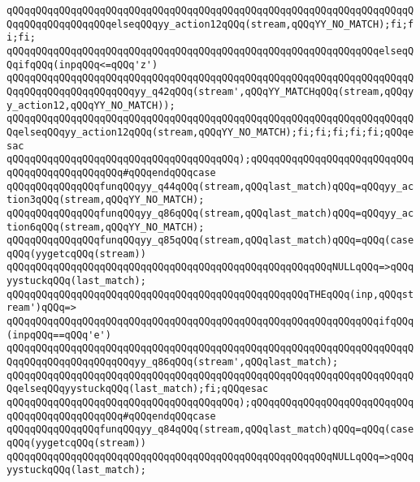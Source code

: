 \verb|qQQqqQQqqQQqqQQqqQQqqQQqqQQqqQQqqQQqqQQqqQQqqQQqqQQqqQQqqQQqqQQqqQQqqQQqqQQqqQQqqQQqqQQqelseqQQqyy_action12qQQq(stream,qQQqYY_NO_MATCH);fi;fi;fi;|\newline
\verb|qQQqqQQqqQQqqQQqqQQqqQQqqQQqqQQqqQQqqQQqqQQqqQQqqQQqqQQqqQQqqQQqelseqQQqifqQQq(inpqQQq<=qQQq'z')|\newline
\verb|qQQqqQQqqQQqqQQqqQQqqQQqqQQqqQQqqQQqqQQqqQQqqQQqqQQqqQQqqQQqqQQqqQQqqQQqqQQqqQQqqQQqqQQqqQQqyy_q42qQQq(stream',qQQqYY_MATCHqQQq(stream,qQQqyy_action12,qQQqYY_NO_MATCH));|\newline
\verb|qQQqqQQqqQQqqQQqqQQqqQQqqQQqqQQqqQQqqQQqqQQqqQQqqQQqqQQqqQQqqQQqqQQqqQQqelseqQQqyy_action12qQQq(stream,qQQqYY_NO_MATCH);fi;fi;fi;fi;fi;qQQqesac|\newline
\verb|qQQqqQQqqQQqqQQqqQQqqQQqqQQqqQQqqQQqqQQq);qQQqqQQqqQQqqQQqqQQqqQQqqQQqqQQqqQQqqQQqqQQqqQQq#qQQqendqQQqcase|\newline
\verb|qQQqqQQqqQQqqQQqfunqQQqyy_q44qQQq(stream,qQQqlast_match)qQQq=qQQqyy_action3qQQq(stream,qQQqYY_NO_MATCH);|\newline
\verb|qQQqqQQqqQQqqQQqfunqQQqyy_q86qQQq(stream,qQQqlast_match)qQQq=qQQqyy_action6qQQq(stream,qQQqYY_NO_MATCH);|\newline
\verb|qQQqqQQqqQQqqQQqfunqQQqyy_q85qQQq(stream,qQQqlast_match)qQQq=qQQq(caseqQQq(yygetcqQQq(stream))|\newline
\verb|qQQqqQQqqQQqqQQqqQQqqQQqqQQqqQQqqQQqqQQqqQQqqQQqqQQqqQQqNULLqQQq=>qQQqyystuckqQQq(last_match);|\newline
\verb|qQQqqQQqqQQqqQQqqQQqqQQqqQQqqQQqqQQqqQQqqQQqqQQqqQQqTHEqQQq(inp,qQQqstream')qQQq=>|\newline
\verb|qQQqqQQqqQQqqQQqqQQqqQQqqQQqqQQqqQQqqQQqqQQqqQQqqQQqqQQqqQQqqQQqifqQQq(inpqQQq==qQQq'e')|\newline
\verb|qQQqqQQqqQQqqQQqqQQqqQQqqQQqqQQqqQQqqQQqqQQqqQQqqQQqqQQqqQQqqQQqqQQqqQQqqQQqqQQqqQQqqQQqqQQqyy_q86qQQq(stream',qQQqlast_match);|\newline
\verb|qQQqqQQqqQQqqQQqqQQqqQQqqQQqqQQqqQQqqQQqqQQqqQQqqQQqqQQqqQQqqQQqqQQqqQQqelseqQQqyystuckqQQq(last_match);fi;qQQqesac|\newline
\verb|qQQqqQQqqQQqqQQqqQQqqQQqqQQqqQQqqQQqqQQq);qQQqqQQqqQQqqQQqqQQqqQQqqQQqqQQqqQQqqQQqqQQqqQQq#qQQqendqQQqcase|\newline
\verb|qQQqqQQqqQQqqQQqfunqQQqyy_q84qQQq(stream,qQQqlast_match)qQQq=qQQq(caseqQQq(yygetcqQQq(stream))|\newline
\verb|qQQqqQQqqQQqqQQqqQQqqQQqqQQqqQQqqQQqqQQqqQQqqQQqqQQqqQQqNULLqQQq=>qQQqyystuckqQQq(last_match);|\newline
